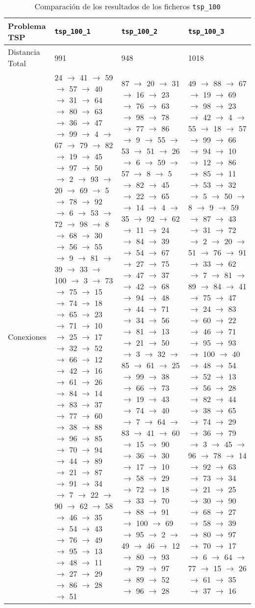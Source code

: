 \documentclass[a4paper,11pt]{article}
\begin{document}
\begin{table}[!htbp]
\label{results_tsp_100}
\centering
\begin{tabularx}{\textwidth}{|p{2cm}|X|X|X|}
\hline
Problema TSP    & \texttt{tsp\_100\_1}  & \texttt{tsp\_100\_2}  & \texttt{tsp\_100\_3}  \\ \hline
Distancia Total & 991   & 948   & 1018	\\ \hline
Conexiones	& 24 $\to$ 41 $\to$ 59 $\to$ 57 $\to$ 40 $\to$ 31 $\to$ 64 $\to$ 80 $\to$ 63 $\to$ 36 $\to$ 47 $\to$ 99 $\to$ 4 $\to$ 67 $\to$ 79 $\to$ 82 $\to$ 19 $\to$ 45 $\to$ 97 $\to$ 50 $\to$ 2 $\to$ 93 $\to$ 20 $\to$ 69 $\to$ 5 $\to$ 78 $\to$ 92 $\to$ 6 $\to$ 53 $\to$ 72 $\to$ 98 $\to$ 8 $\to$ 68 $\to$ 30 $\to$ 56 $\to$ 55 $\to$ 9 $\to$ 81 $\to$ 39 $\to$ 33 $\to$ 100 $\to$ 3 $\to$ 73 $\to$ 75 $\to$ 15 $\to$ 74 $\to$ 18 $\to$ 65 $\to$ 23 $\to$ 71 $\to$ 10 $\to$ 25 $\to$ 17 $\to$ 32 $\to$ 52 $\to$ 66 $\to$ 12 $\to$ 42 $\to$ 16 $\to$ 61 $\to$ 26 $\to$ 84 $\to$ 14 $\to$ 83 $\to$ 37 $\to$ 77 $\to$ 60 $\to$ 38 $\to$ 88 $\to$ 96 $\to$ 85 $\to$ 70 $\to$ 94 $\to$ 44 $\to$ 89 $\to$ 21 $\to$ 87 $\to$ 91 $\to$ 34 $\to$ 7 $\to$ 22 $\to$ 90 $\to$ 62 $\to$ 58 $\to$ 46 $\to$ 35 $\to$ 54 $\to$ 43 $\to$ 76 $\to$ 49 $\to$ 95 $\to$ 13 $\to$ 48 $\to$ 11 $\to$ 27 $\to$ 29 $\to$ 86 $\to$ 28 $\to$ 51	& 87 $\to$ 20 $\to$ 31 $\to$ 16 $\to$ 23 $\to$ 76 $\to$ 63 $\to$ 98 $\to$ 78 $\to$ 77 $\to$ 86 $\to$ 9 $\to$ 55 $\to$ 53 $\to$ 51 $\to$ 26 $\to$ 6 $\to$ 59 $\to$ 57 $\to$ 8 $\to$ 5 $\to$ 82 $\to$ 45 $\to$ 22 $\to$ 65 $\to$ 14 $\to$ 4 $\to$ 35 $\to$ 92 $\to$ 62 $\to$ 11 $\to$ 24 $\to$ 84 $\to$ 39 $\to$ 54 $\to$ 67 $\to$ 27 $\to$ 75 $\to$ 47 $\to$ 37 $\to$ 42 $\to$ 68 $\to$ 94 $\to$ 48 $\to$ 44 $\to$ 71 $\to$ 34 $\to$ 56 $\to$ 81 $\to$ 13 $\to$ 21 $\to$ 50 $\to$ 3 $\to$ 32 $\to$ 85 $\to$ 61 $\to$ 25 $\to$ 99 $\to$ 38 $\to$ 66 $\to$ 73 $\to$ 19 $\to$ 43 $\to$ 74 $\to$ 40 $\to$ 7 $\to$ 64 $\to$ 83 $\to$ 41 $\to$ 60 $\to$ 15 $\to$ 90 $\to$ 36 $\to$ 30 $\to$ 17 $\to$ 10 $\to$ 58 $\to$ 29 $\to$ 72 $\to$ 18 $\to$ 33 $\to$ 70 $\to$ 88 $\to$ 91 $\to$ 100 $\to$ 69 $\to$ 95 $\to$ 2 $\to$ 49 $\to$ 46 $\to$ 12 $\to$ 80 $\to$ 93 $\to$ 79 $\to$ 97 $\to$ 89 $\to$ 52 $\to$ 96 $\to$ 28	& 49 $\to$ 88 $\to$ 67 $\to$ 19 $\to$ 69 $\to$ 98 $\to$ 23 $\to$ 42 $\to$ 4 $\to$ 55 $\to$ 18 $\to$ 57 $\to$ 99 $\to$ 66 $\to$ 94 $\to$ 10 $\to$ 12 $\to$ 86 $\to$ 85 $\to$ 11 $\to$ 53 $\to$ 32 $\to$ 5 $\to$ 50 $\to$ 8 $\to$ 9 $\to$ 59 $\to$ 87 $\to$ 43 $\to$ 31 $\to$ 72 $\to$ 2 $\to$ 20 $\to$ 51 $\to$ 76 $\to$ 91 $\to$ 33 $\to$ 62 $\to$ 7 $\to$ 81 $\to$ 89 $\to$ 84 $\to$ 41 $\to$ 75 $\to$ 47 $\to$ 24 $\to$ 83 $\to$ 60 $\to$ 22 $\to$ 46 $\to$ 71 $\to$ 95 $\to$ 93 $\to$ 100 $\to$ 40 $\to$ 48 $\to$ 54 $\to$ 52 $\to$ 13 $\to$ 56 $\to$ 28 $\to$ 82 $\to$ 44 $\to$ 38 $\to$ 65 $\to$ 74 $\to$ 29 $\to$ 36 $\to$ 79 $\to$ 3 $\to$ 45 $\to$ 96 $\to$ 78 $\to$ 14 $\to$ 92 $\to$ 63 $\to$ 73 $\to$ 34 $\to$ 21 $\to$ 25 $\to$ 30 $\to$ 90 $\to$ 68 $\to$ 27 $\to$ 58 $\to$ 39 $\to$ 80 $\to$ 97 $\to$ 70 $\to$ 17 $\to$ 6 $\to$ 64 $\to$ 77 $\to$ 15 $\to$ 26 $\to$ 61 $\to$ 35 $\to$ 37 $\to$ 16	\\ \hline
\end{tabularx}
\caption{Comparación de los resultados de los ficheros \texttt{tsp\_100}}
\end{table}
\end{document}
